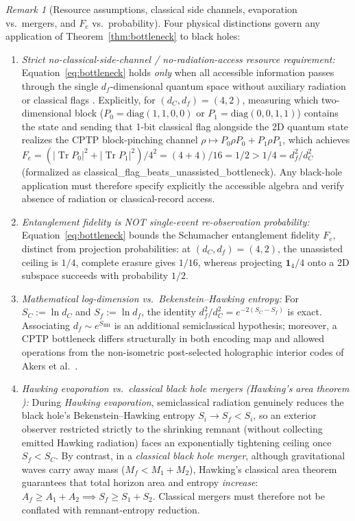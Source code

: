 \documentclass[11pt,a4paper]{article}
\theoremstyle{definition}
\theoremstyle{remark}
\newtheorem{remark}{Remark}
\newcommand{\Tr}{\operatorname{Tr}}
\newcommand{\1}{\mathbf{1}}
\newcommand{\code}[1]{{\footnotesize\ttfamily #1}}
\begin{document}
\begin{remark}[Resource assumptions, classical side channels, evaporation vs.\ mergers, and $F_e$ vs.\ probability]\label{rem:bottleneck-scope}
Four physical distinctions govern any application of Theorem~\ref{thm:bottleneck} to black holes:
\begin{enumerate}
  \item \emph{Strict no-classical-side-channel / no-radiation-access resource requirement:} Equation~\eqref{eq:bottleneck} holds \emph{only} when all accessible information passes through the single $d_f$-dimensional quantum space without auxiliary radiation or classical flags \cite{FarberGour2026}. Explicitly, for $(d_C, d_f) = (4, 2)$, measuring which two-dimensional block ($P_0=\mathrm{diag}(1,1,0,0)$ or $P_1=\mathrm{diag}(0,0,1,1)$) contains the state and sending that 1-bit classical flag alongside the 2D quantum state realizes the CPTP block-pinching channel $\rho\mapsto P_0\rho P_0 + P_1\rho P_1$, which achieves $F_e = (|\Tr P_0|^2 + |\Tr P_1|^2)/4^2 = (4+4)/16 = 1/2 > 1/4 = d_f^2/d_C^2$ (formalized as \code{classical\_\allowbreak flag\_\allowbreak beats\_\allowbreak unassisted\_\allowbreak bottleneck}). Any black-hole application must therefore specify explicitly the accessible algebra and verify absence of radiation or classical-record access.
  \item \emph{Entanglement fidelity is NOT single-event re-observation probability:} Equation~\eqref{eq:bottleneck} bounds the Schumacher entanglement fidelity $F_e$, distinct from projection probabilities: at $(d_C, d_f) = (4, 2)$, the unassisted ceiling is $1/4$, complete erasure gives $1/16$, whereas projecting $\1_4/4$ onto a 2D subspace succeeds with probability $1/2$.
  \item \emph{Mathematical log-dimension vs.\ Bekenstein--Hawking entropy:} For $S_C := \ln d_C$ and $S_f := \ln d_f$, the identity $d_f^2/d_C^2 = e^{-2(S_C - S_f)}$ is exact. Associating $d_f \sim e^{S_{\mathrm{BH}}}$ is an additional semiclassical hypothesis; moreover, a CPTP bottleneck differs structurally in both encoding map and allowed operations from the non-isometric post-selected holographic interior codes of Akers et al.\ \cite{Akers2022}.
  \item \emph{Hawking evaporation vs.\ classical black hole mergers (Hawking's area theorem \cite{Hawking1971}):} During \emph{Hawking evaporation}, semiclassical radiation genuinely reduces the black hole's Bekenstein--Hawking entropy $S_i \to S_f < S_i$, so an exterior observer restricted strictly to the shrinking remnant (without collecting emitted Hawking radiation) faces an exponentially tightening ceiling once $S_f < S_C$. By contrast, in a \emph{classical black hole merger}, although gravitational waves carry away mass ($M_f < M_1 + M_2$), Hawking's classical area theorem \cite{Hawking1971} guarantees that total horizon area and entropy \emph{increase}: $A_f \ge A_1 + A_2 \implies S_f \ge S_1 + S_2$. Classical mergers must therefore not be conflated with remnant-entropy reduction.
\end{enumerate}
\end{remark}
\end{document}
